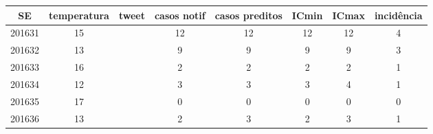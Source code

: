 \begin{tabular}{c|ccccccc}
  \hline
SE & temperatura & tweet & casos notif & casos preditos & ICmin & ICmax & incidência \\ 
  \hline
201631 & 15 &  & 12 & 12 & 12 & 12 & 4 \\ 
  201632 & 13 &  & 9 & 9 & 9 & 9 & 3 \\ 
  201633 & 16 &  & 2 & 2 & 2 & 2 & 1 \\ 
  201634 & 12 &  & 3 & 3 & 3 & 4 & 1 \\ 
  201635 & 17 &  & 0 & 0 & 0 & 0 & 0 \\ 
  201636 & 13 &  & 2 & 3 & 2 & 3 & 1 \\ 
   \hline
\end{tabular}
